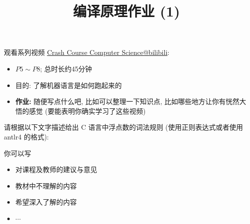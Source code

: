 \documentclass[a4paper, justified]{tufte-handout}
\title{编译原理作业 (1)}
\date{\zhtoday}
\begin{document}
\maketitle
\noplagiarism %
\begin{abstract}
\end{abstract}
\beginrequired
\begin{problem}
  观看系列视频 \href{https://www.bilibili.com/video/BV1EW411u7th?}{Crash Course Computer Science@bilibili}:
  \begin{itemize}
    \item $P5 \sim P8$; 总时长约45分钟
    \item 目的: 了解机器语言是如何跑起来的
    \item {\bf 作业:} 随便写点什么吧, 比如可以整理一下知识点, 比如哪些地方让你有恍然大悟的感觉
    (要能表明你确实学习了这些视频)
  \end{itemize}
\end{problem}

\begin{solution}
\end{solution}

\begin{problem}
  请根据以下文字描述给出 C 语言中浮点数的词法规则
  (使用正则表达式或者使用 antlr4 的格式):


\end{problem}

\begin{solution}
\end{solution}



\beginfb

你可以写
\begin{itemize}
  \item 对课程及教师的建议与意见
  \item 教材中不理解的内容
  \item 希望深入了解的内容
  \item $\cdots$
\end{itemize}
\end{document}
